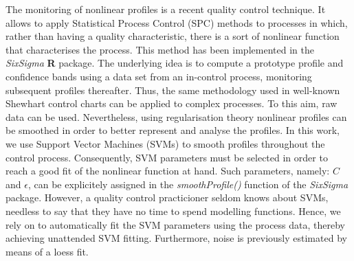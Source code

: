 \documentclass[\main/boa.tex]{subfiles}
\begin{document}
The monitoring of nonlinear profiles is a recent quality control
technique. It allows to apply Statistical Process Control (SPC) methods
to processes in which, rather than having a quality characteristic,
there is a sort of nonlinear function that characterises the process.
This method has been implemented in the \emph{SixSigma} \textbf{R}
package. The underlying idea is to compute a prototype profile and
confidence bands using a data set from an in-control process, monitoring
subsequent profiles thereafter. Thus, the same methodology used in
well-known Shewhart control charts can be applied to complex processes.
To this aim, raw data can be used. Nevertheless, using regularisation
theory nonlinear profiles can be smoothed in order to better represent
and analyse the profiles. In this work, we use Support Vector Machines
(SVMs) to smooth profiles throughout the control process. Consequently,
SVM parameters must be selected in order to reach a good fit of the
nonlinear function at hand. Such parameters, namely: \(C\) and
\(\epsilon\), can be explicitely assigned in the \emph{smoothProfile()}
function of the \emph{SixSigma} package. However, a quality control
practicioner seldom knows about SVMs, needless to say that they have no
time to spend modelling functions. Hence, we rely on to automatically
fit the SVM parameters using the process data, thereby achieving
unattended SVM fitting. Furthermore, noise is previously estimated by
means of a loess fit.
\end{document}
